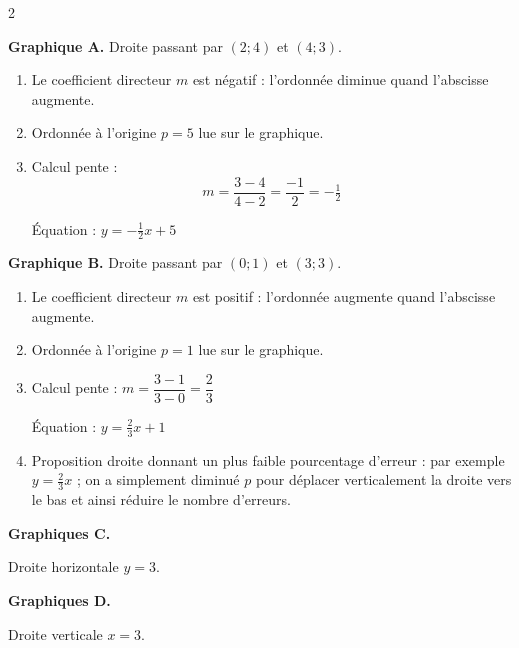\begin{multicols}{2}
			\begin{MADenumerate}
				\item \textbf{Graphique A.} Droite passant par $(2; 4)$ et $(4; 3)$.
				\begin{enumerate}
					\item Le coefficient directeur $m$ est négatif : l'ordonnée diminue quand l'abscisse augmente.
					\item Ordonnée à l'origine $p=5$ lue sur le graphique.
					\item Calcul pente : $$m=\dfrac{3-4}{4-2}=\dfrac{-1}{2}=-\tfrac{1}{2}$$

					      Équation : $\boxed{y = -\tfrac{1}{2}x + 5}$
				\end{enumerate}

				\item \textbf{Graphique B.} Droite passant par $(0; 1)$ et $(3; 3)$.
				\begin{enumerate}
					\item Le coefficient directeur $m$ est positif : l'ordonnée augmente quand l'abscisse augmente.
					\item Ordonnée à l'origine $p=1$ lue sur le graphique.
					\item Calcul pente : $m=\dfrac{3-1}{3-0}=\dfrac{2}{3}$

					      Équation : $\boxed{y=\tfrac{2}{3}x + 1}$
					\item Proposition droite donnant un plus faible pourcentage d'erreur : par exemple $y=\tfrac{2}{3}x$ ; on a simplement diminué $p$ pour déplacer verticalement la droite vers le bas et ainsi réduire le nombre d'erreurs.
				\end{enumerate}

				\item \textbf{Graphiques C.}

				Droite horizontale $y=3$.

				\textbf{Graphiques D.}

				Droite verticale $x=3$.
			\end{MADenumerate}
		\end{multicols}

